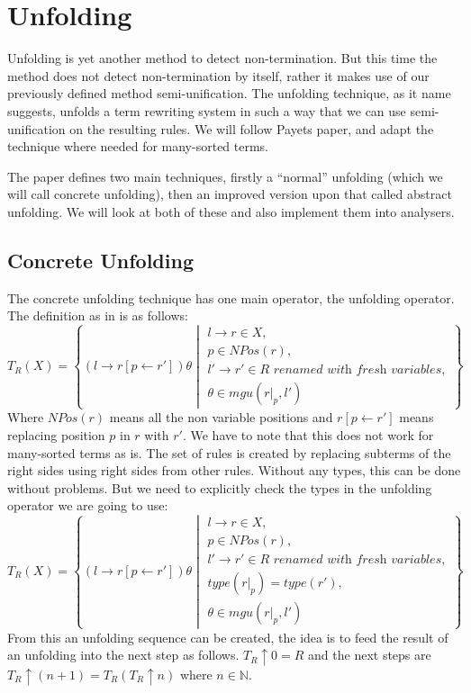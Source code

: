 \chapter{Unfolding}\label{unfolding}
Unfolding is yet another method to detect non-termination. But this time the method does not detect non-termination by itself, rather it makes use of our previously defined method semi-unification. The unfolding technique, as it name suggests, unfolds a term rewriting system in such a way that we can use semi-unification on the resulting rules. We will follow Payets paper\cite{Payet:Unfolding}, and adapt the technique where needed for many-sorted terms. 

The paper defines two main techniques, firstly a ``normal'' unfolding (which we will call concrete unfolding), then an improved version upon that called abstract unfolding. We will look at both of these and also implement them into analysers. 

\section{Concrete Unfolding}
The concrete unfolding technique has one main operator, the unfolding operator. The definition as in \cite{Payet:Unfolding} is as follows:
\[
T_R(X) = \left\{ \left( l \rightarrow r\left[ p \leftarrow r' \right] \right)\theta \middle\vert \begin{array}{l} 
l \rightarrow r \in X, \\
p \in \textit{NPos}(r), \\
l' \rightarrow r' \in R \textit{ renamed with fresh variables}, \\
\theta \in mgu(\left.r\right|_p, l')
\end{array}
\right\} 
\]
Where $\textit{NPos}(r)$ means all the non variable positions and $r\left[ p \leftarrow r'\right]$ means replacing position $p$ in $r$ with $r'$. We have to note that this does not work for many-sorted terms as is. The set of rules is created by replacing subterms of the right sides using right sides from other rules. Without any types, this can be done without problems. But we need to explicitly check the types in the unfolding operator we are going to use:
\[
T_R(X) = \left\{ \left( l \rightarrow r\left[ p \leftarrow r' \right] \right)\theta \middle\vert \begin{array}{l} 
l \rightarrow r \in X, \\
p \in \textit{NPos}(r), \\
l' \rightarrow r' \in R \textit{ renamed with fresh variables}, \\
\textit{type}(\left.r\right|_p) = \textit{type}(r'),\\
\theta \in mgu(\left.r\right|_p, l')
\end{array}
\right\} 
\]
From this an unfolding sequence can be created, the idea is to feed the result of an unfolding into the next step as follows. $T_R \uparrow 0 = R$ and the next steps are $T_R \uparrow (n + 1) = T_R(T_R \uparrow n)$ where $n \in \mathbb{N}$. 

